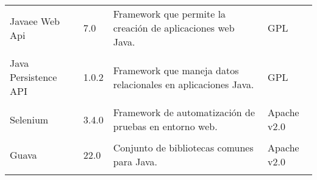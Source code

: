 \begin{longtable}[]{@{}llll@{}}
\begin{minipage}[t]{0.18\columnwidth}\raggedright\strut
Javaee Web Api \cite{lic:jwa} \strut
\end{minipage} & \begin{minipage}[t]{0.08\columnwidth}\raggedright\strut
7.0\strut
\end{minipage} & \begin{minipage}[t]{0.49\columnwidth}\raggedright\strut
Framework que permite la creación de aplicaciones web Java.\strut
\end{minipage} & \begin{minipage}[t]{0.11\columnwidth}\raggedright\strut
GPL\strut
\end{minipage}\tabularnewline\tabularnewline


\begin{minipage}[t]{0.18\columnwidth}\raggedright\strut
Java Persistence API \cite{lic:jpa} \strut
\end{minipage} & \begin{minipage}[t]{0.08\columnwidth}\raggedright\strut
1.0.2\strut
\end{minipage} & \begin{minipage}[t]{0.49\columnwidth}\raggedright\strut
Framework que maneja datos relacionales en aplicaciones Java.\strut
\end{minipage} & \begin{minipage}[t]{0.11\columnwidth}\raggedright\strut
GPL\strut
\end{minipage}\tabularnewline\tabularnewline


\begin{minipage}[t]{0.18\columnwidth}\raggedright\strut
Selenium \cite{lic:sele} \strut
\end{minipage} & \begin{minipage}[t]{0.08\columnwidth}\raggedright\strut
3.4.0\strut
\end{minipage} & \begin{minipage}[t]{0.49\columnwidth}\raggedright\strut
Framework de automatización de pruebas en entorno web.\strut
\end{minipage} & \begin{minipage}[t]{0.11\columnwidth}\raggedright\strut
Apache v2.0\strut
\end{minipage}\tabularnewline\tabularnewline


\begin{minipage}[t]{0.18\columnwidth}\raggedright\strut
Guava \cite{lic:guava} \strut
\end{minipage} & \begin{minipage}[t]{0.08\columnwidth}\raggedright\strut
22.0\strut
\end{minipage} & \begin{minipage}[t]{0.49\columnwidth}\raggedright\strut
Conjunto de bibliotecas comunes para Java.\strut
\end{minipage} & \begin{minipage}[t]{0.11\columnwidth}\raggedright\strut
Apache v2.0\strut
\end{minipage}\tabularnewline\tabularnewline



\end{longtable}
